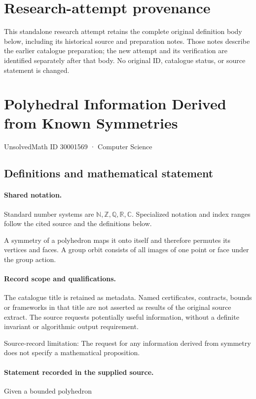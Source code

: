 \documentclass[11pt]{article}
\begin{document}
\section*{Research-attempt provenance}
This standalone research attempt retains the complete original definition body below,
including its historical source and preparation notes. Those notes describe the
earlier catalogue preparation; the new attempt and its verification are identified
separately after that body. No original ID, catalogue status, or source statement is changed.

\section{Polyhedral Information Derived from Known Symmetries}\label{30001569}
{\small UnsolvedMath ID 30001569 · Computer Science}
\subsection{Definitions and mathematical statement}

\paragraph{Shared notation.}Standard number systems are $\mathbb N,\mathbb Z,\mathbb Q,\mathbb R,\mathbb C$. Specialized notation and index ranges follow the cited source and the definitions below.


A symmetry of a polyhedron maps it onto itself and therefore permutes its vertices and faces. A group orbit consists of all images of one point or face under the group action.
\paragraph{Record scope and qualifications.}
The catalogue title is retained as metadata. Named certificates, contracts, bounds or frameworks in that title are not asserted as results of the original source extract.
The source requests potentially useful information, without a definite invariant or algorithmic output requirement.

Source-record limitation: The request for any information derived from symmetry does not specify a mathematical proposition.
\paragraph{Statement recorded in the supplied source.}
Given a bounded polyhedron
\end{document}
